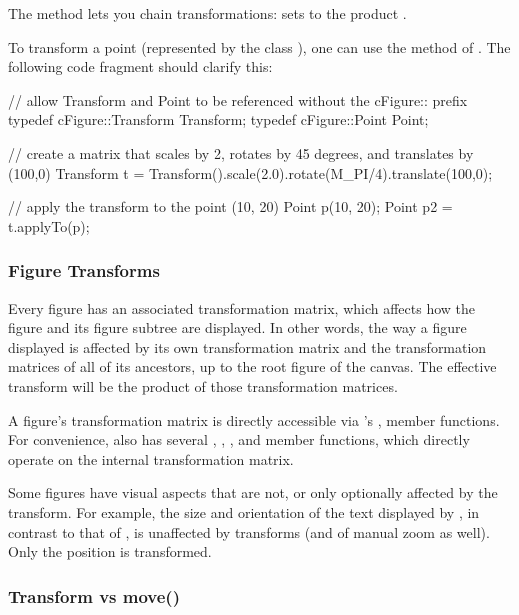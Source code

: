 The  method lets you chain transformations: 
sets  to the product .

To transform a point (represented by the class ),
one can use the  method of . The
following code fragment should clarify this:

\begin{cpp}
// allow Transform and Point to be referenced without the cFigure:: prefix
typedef cFigure::Transform Transform;
typedef cFigure::Point Point;

// create a matrix that scales by 2, rotates by 45 degrees, and translates by (100,0)
Transform t = Transform().scale(2.0).rotate(M_PI/4).translate(100,0);

// apply the transform to the point (10, 20)
Point p(10, 20);
Point p2 = t.applyTo(p);
\end{cpp}


\subsubsection{Figure Transforms}
\label{sec:graphics:figure-transforms}

Every figure has an associated transformation matrix, which
affects how the figure and its figure subtree are displayed.
In other words, the way a figure displayed is affected by its own
transformation matrix and the transformation matrices of all of its
ancestors, up to the root figure of the canvas. The effective transform
will be the product of those transformation matrices.

A figure's transformation matrix is directly accessible via 's
,  member functions.
For convenience,  also has several , ,
,  and  member functions,
which directly operate on the internal transformation matrix.

Some figures have visual aspects that are not, or only optionally affected
by the transform. For example, the size and orientation of the text
displayed by , in contrast to that of
, is unaffected by transforms (and of manual zoom as
well). Only the position is transformed.

\subsubsection{Transform vs move()}
\label{sec:graphics:figure-transform-vs-move}

